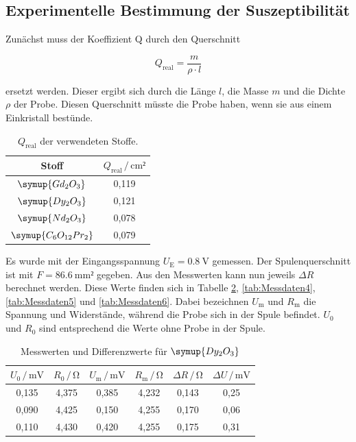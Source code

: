 \subsection{Experimentelle Bestimmung der Suszeptibilität}

Zunächst muss der Koeffizient Q durch den Querschnitt

\begin{equation}
Q_\text{real} = \frac{m}{\rho \cdot l}
\end{equation}

ersetzt werden. Dieser ergibt sich durch die Länge $l$, die Masse $m$ und 
die Dichte $\rho$ der Probe. Diesen Querschnitt müsste die Probe haben, wenn 
sie aus einem Einkristall bestünde.

\begin{table}
\centering
\caption{$Q_\text{real}$ der verwendeten Stoffe.}
\label{tab:Messdaten2}
\begin{tabular}{c c}
\toprule
Stoff & $Q_\text{real} \,/\, \si{\centi\meter²}$\\
\midrule
$\symup{Gd_2O_3}$ & 0,119\\
$\symup{Dy_2O_3}$ & 0,121\\
$\symup{Nd_2O_3}$ & 0,078\\
$\symup{C_6O_\text{12}Pr_2}$ & 0,079\\
\bottomrule
\end{tabular}
\end{table}

Es wurde mit der Eingangsspannung $U_\text{E} = \SI{0.8}{\volt}$ gemessen. Der 
Spulenquerschnitt ist mit $F = \SI{86.6}{\milli\meter²}$ gegeben. Aus den Messwerten
kann nun jeweils $\Delta R$ berechnet werden. Diese Werte finden sich in Tabelle \ref{tab:Messdaten3}, 
\ref{tab:Messdaten4}, \ref{tab:Messdaten5} und \ref{tab:Messdaten6}.
Dabei bezeichnen $U_\text{m}$ und $R_\text{m}$ die Spannung und Widerstände, 
während die Probe sich in der Spule befindet. $U_\text{0}$ und $R_\text{0}$
sind entsprechend die Werte ohne Probe in der Spule. 

\begin{table}
\centering
\caption{Messwerten und Differenzwerte für $\symup{Dy_2O_3}$}
\label{tab:Messdaten3}
\begin{tabular}{c c c c c c}
\toprule
$U_\text{0} \,/\, \si{\milli\volt}$ & $R_\text{0} \,/\, \si{\ohm}$ & $U_\text{m} \,/\, \si{\milli\volt}$& $R_\text{m} \,/\, \si{\ohm}$ & $\Delta R \,/\, \si{\ohm}$ & $\Delta U \,/\, \si{\milli\volt}$ \\
\midrule
0,135 & 4,375 & 0,385 & 4,232 & 0,143 & 0,25\\
0,090 & 4,425 & 0,150 & 4,255 & 0,170 & 0,06\\
0,110 & 4,430 & 0,420 & 4,255 & 0,175 & 0,31\\ 
\bottomrule
\end{tabular}
\end{table}

